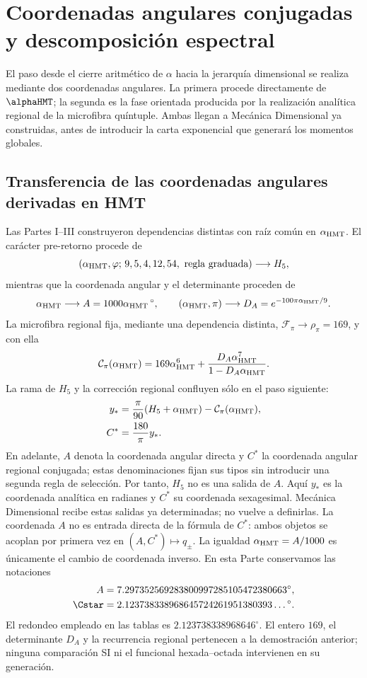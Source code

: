 \chapter{Coordenadas angulares conjugadas y descomposición espectral}
\label{chap:canales}

El paso desde el cierre aritmético de \(\alpha\) hacia la jerarquía
dimensional se realiza mediante dos coordenadas angulares. La primera procede
directamente de \(\alphaHMT\); la segunda es la fase orientada producida por
la realización analítica regional de la microfibra quíntuple. Ambas llegan a
Mecánica Dimensional ya construidas, antes de introducir la carta exponencial
que generará los momentos globales.

\section{Transferencia de las coordenadas angulares derivadas en HMT}

Las Partes I--III construyeron dependencias distintas con raíz común en
\(\alpha_{\rm HMT}\). El carácter pre-retorno procede de
\[
(\alpha_{\rm HMT},\varphi;\,9,5,4,12,54,\text{ regla graduada})
\longrightarrow H_5,
\]
mientras que la coordenada angular y el determinante proceden de
\[
\alpha_{\rm HMT}\longrightarrow
A=1000\alpha_{\rm HMT}\,{}^\circ,
\qquad
(\alpha_{\rm HMT},\pi)\longrightarrow
D_A=e^{-100\pi\alpha_{\rm HMT}/9}.
\]
La microfibra regional fija, mediante una dependencia distinta,
\(\mathcal F_\pi\to\rho_\pi=169\), y con ella
\[
\mathcal C_\pi(\alpha_{\rm HMT})
=169\alpha_{\rm HMT}^{6}
+\frac{D_A\alpha_{\rm HMT}^{7}}
       {1-D_A\alpha_{\rm HMT}}.
\]
La rama de \(H_5\) y la corrección regional confluyen sólo en el paso
siguiente:
\[
\begin{aligned}
y_*&=\frac{\pi}{90}(H_5+\alpha_{\rm HMT})
     -\mathcal C_\pi(\alpha_{\rm HMT}),\\
C^*&=\frac{180}{\pi}y_*.
\end{aligned}
\]
En adelante, \(A\) denota la coordenada angular directa y \(C^*\) la
coordenada angular regional conjugada; estas denominaciones fijan sus tipos
sin introducir una segunda regla de selección.
Por tanto, \(H_5\) no es una salida de \(A\). Aquí \(y_*\) es la coordenada
analítica en radianes y \(C^*\) su coordenada sexagesimal. Mecánica
Dimensional recibe estas salidas ya determinadas; no vuelve a definirlas.
La coordenada \(A\) no es entrada directa de la fórmula de \(C^*\): ambos
objetos se acoplan por primera vez en \((A,C^*)\mapsto q_\pm\). La igualdad
\(\alpha_{\rm HMT}=A/1000\) es únicamente el cambio de coordenada inverso.
En esta Parte conservamos las notaciones
\[
\begin{aligned}
 A&=7.297352569283800997285105472380663^\circ,\\
 \Cstar&=2.123738338968645724261951380393\ldots{}^\circ.
\end{aligned}
\]
El redondeo empleado en las tablas es
\(2.123738338968646^\circ\). El entero \(169\), el determinante \(D_A\) y
la recurrencia regional pertenecen a la demostración anterior; ninguna
comparación SI ni el funcional hexada--octada intervienen en su generación.

